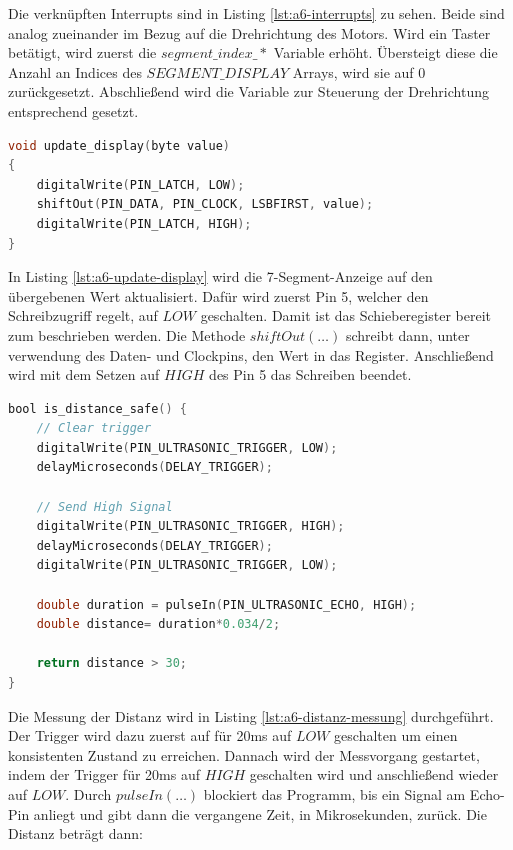 Die verknüpften Interrupts sind in Listing \ref{lst:a6-interrupts} zu sehen.
Beide sind analog zueinander im Bezug auf die Drehrichtung des Motors.
Wird ein Taster betätigt, wird zuerst die $segment\_index\_*$ Variable erhöht.
Übersteigt diese die Anzahl an Indices des $SEGMENT\_DISPLAY$ Arrays, wird sie auf 0 zurückgesetzt.
Abschließend wird die Variable zur Steuerung der Drehrichtung entsprechend gesetzt.

\begin{lstlisting}[language=C,label={lst:a6-update-display}, caption={Aktualisierung der 7-Segment-Anzeige}]
void update_display(byte value)
{
    digitalWrite(PIN_LATCH, LOW);
    shiftOut(PIN_DATA, PIN_CLOCK, LSBFIRST, value);
    digitalWrite(PIN_LATCH, HIGH);
}
\end{lstlisting}

In Listing \ref{lst:a6-update-display} wird die 7-Segment-Anzeige auf den übergebenen Wert aktualisiert.
Dafür wird zuerst Pin 5, welcher den Schreibzugriff regelt, auf $LOW$ geschalten.
Damit ist das Schieberegister bereit zum beschrieben werden.
Die Methode $shiftOut(\dots)$ schreibt dann, unter verwendung des Daten- und Clockpins, den Wert in das Register.
Anschließend wird mit dem Setzen auf $HIGH$ des Pin 5 das Schreiben beendet.

\newpage

\begin{lstlisting}[language=C,label={lst:a6-distanz-messung}, caption={Distanz Messung}]
bool is_distance_safe() {
    // Clear trigger
    digitalWrite(PIN_ULTRASONIC_TRIGGER, LOW);
    delayMicroseconds(DELAY_TRIGGER);

    // Send High Signal
    digitalWrite(PIN_ULTRASONIC_TRIGGER, HIGH);
    delayMicroseconds(DELAY_TRIGGER);
    digitalWrite(PIN_ULTRASONIC_TRIGGER, LOW);

    double duration = pulseIn(PIN_ULTRASONIC_ECHO, HIGH);
    double distance= duration*0.034/2;

    return distance > 30;
}
\end{lstlisting}

Die Messung der Distanz wird in Listing \ref{lst:a6-distanz-messung} durchgeführt.
Der Trigger wird dazu zuerst auf für 20ms auf $LOW$ geschalten um einen konsistenten Zustand zu erreichen.
Dannach wird der Messvorgang gestartet, indem der Trigger für 20ms auf $HIGH$ geschalten wird und anschließend wieder auf $LOW$.
Durch $pulseIn(\dots)$ blockiert das Programm, bis ein Signal am Echo-Pin anliegt und gibt dann die vergangene Zeit, in Mikrosekunden, zurück.
Die Distanz beträgt dann:


